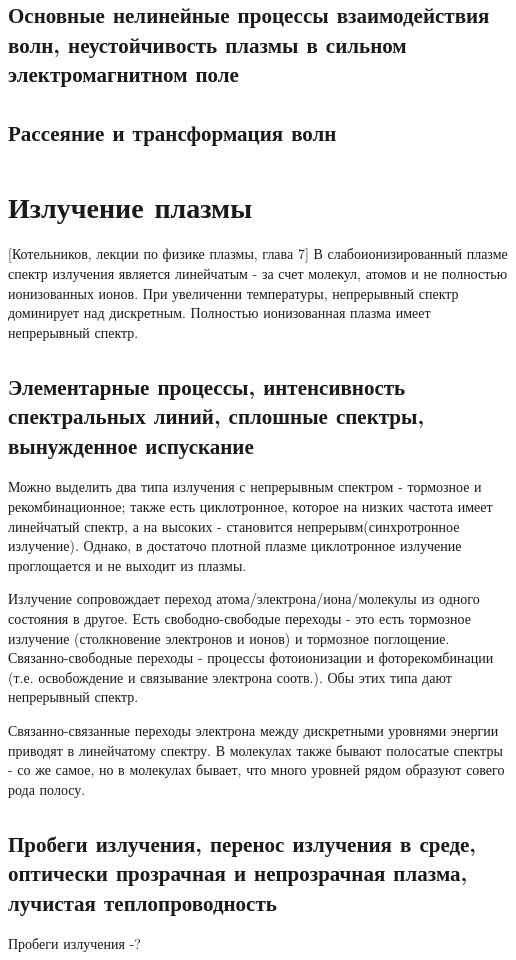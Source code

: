 \documentclass[10pt, a4paper]{article}
\let\stdsection\section
\renewcommand\section{\newpage\stdsection}
\begin{document}
\subsection{Основные нелинейные процессы взаимодействия волн, неустойчивость плазмы в сильном электромагнитном поле}

\subsection{Рассеяние и трансформация волн}

\section{Излучение плазмы}
[Котельников, лекции по физике плазмы, глава 7]
В слабоионизированный плазме спектр излучения является линейчатым - за счет молекул, атомов и не полностью ионизованных
ионов. При увеличенни температуры, непрерывный спектр доминирует над дискретным. Полностью ионизованная плазма имеет
непрерывный спектр.
\subsection{Элементарные процессы, интенсивность спектральных линий, сплошные спектры, вынужденное испускание}
Можно выделить два типа излучения с непрерывным спектром - тормозное и рекомбинационное; также есть циклотронное,
которое на низких частота имеет линейчатый спектр, а на высоких - становится непрерывм(синхротронное излучение). Однако,
в достаточо плотной плазме циклотронное излучение проглощается и не выходит из плазмы.

Излучение сопровождает переход атома/электрона/иона/молекулы из одного состояния в другое. Есть свободно-свободые переходы
- это есть тормозное излучение (столкновение электронов и ионов) и тормозное поглощение. Связанно-свободные переходы - 
процессы фотоионизации и фоторекомбинации (т.е. освобождение и связывание электрона соотв.). Обы этих типа дают 
непрерывный спектр.

Связанно-связанные переходы электрона между дискретными уровнями энергии приводят в линейчатому спектру. В молекулах также
бывают полосатые спектры - со же самое, но в молекулах бывает, что много уровней рядом образуют совего рода полосу.

\subsection{Пробеги излучения, перенос излучения в среде, оптически прозрачная и непрозрачная плазма, лучистая теплопроводность}
Пробеги излучения -?
\end{document}
